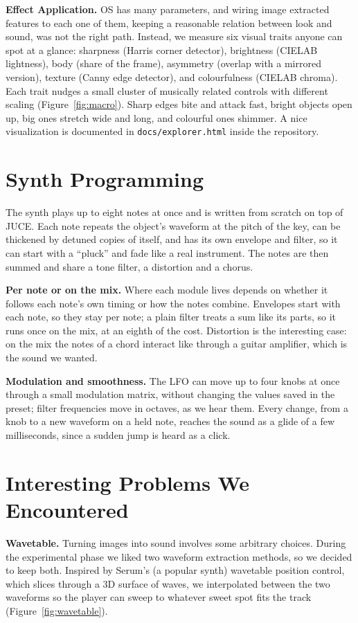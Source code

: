 \documentclass[10pt,a4paper]{article}
\begin{document}
\textbf{Effect Application.} OS has many parameters, and wiring image extracted features to each one of them, keeping a reasonable relation between look and sound, was not the right path. Instead, we measure six visual traits anyone can spot at a glance: sharpness (Harris corner detector), brightness (CIELAB lightness), body (share of the frame), asymmetry (overlap with a mirrored version), texture (Canny edge detector), and colourfulness (CIELAB chroma). Each trait nudges a small cluster of musically related controls with different scaling (Figure~\ref{fig:macro}). Sharp edges bite and attack fast, bright objects open up, big ones stretch wide and long, and colourful ones shimmer. A nice visualization is documented in \texttt{docs/explorer.html} inside the repository.

\section*{Synth Programming}
The synth plays up to eight notes at once and is written from scratch on top of JUCE.
Each note repeats the object's waveform at the pitch of the key, can be thickened by
detuned copies of itself, and has its own envelope and filter, so it can start with a
``pluck'' and fade like a real instrument. The notes are then summed and share a tone
filter, a distortion and a chorus.

\textbf{Per note or on the mix.} Where each module lives depends on whether it follows
each note's own timing or how the notes combine. Envelopes start with each
note, so they stay per note; a plain filter treats a sum like its parts, so it runs once
on the mix, at an eighth of the cost. Distortion is the interesting case: on the mix the
notes of a chord interact like through a guitar amplifier, which is the sound we wanted.

\textbf{Modulation and smoothness.} The LFO can move up to four knobs at once through a
small modulation matrix, without changing the values saved in the preset; filter
frequencies move in octaves, as we hear them. Every change, from a knob to a new
waveform on a held note, reaches the sound as a glide of a few milliseconds, since a
sudden jump is heard as a click.

\section*{Interesting Problems We Encountered}

\textbf{Wavetable.} Turning images into sound involves some arbitrary choices. During the experimental phase we liked two waveform extraction methods, so we decided to keep both. Inspired by Serum's (a popular synth) wavetable position control, which slices through a 3D surface of waves, we interpolated between the two waveforms so the player can sweep to whatever sweet spot fits the track (Figure~\ref{fig:wavetable}).
\end{document}
